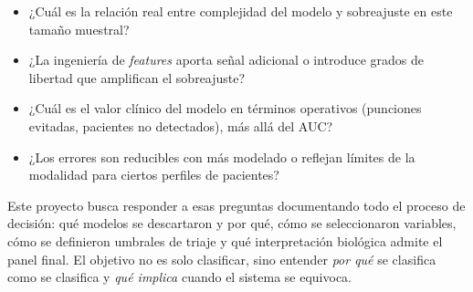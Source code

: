 \begin{itemize}
    \item ¿Cuál es la relación real entre complejidad del modelo y sobreajuste en este tamaño muestral?

    \item ¿La ingeniería de \textit{features} aporta señal adicional o introduce grados de libertad que amplifican el sobreajuste?

    \item ¿Cuál es el valor clínico del modelo en términos operativos (punciones evitadas, pacientes no detectados), más allá del AUC?

    \item ¿Los errores son reducibles con más modelado o reflejan límites de la modalidad para ciertos perfiles de pacientes?
\end{itemize}

Este proyecto busca responder a esas preguntas documentando todo el proceso de decisión: qué modelos se descartaron y por qué, cómo se seleccionaron variables, cómo se definieron umbrales de triaje y qué interpretación biológica admite el panel final. El objetivo no es solo clasificar, sino entender \textit{por qué} se clasifica como se clasifica y \textit{qué implica} cuando el sistema se equivoca.
